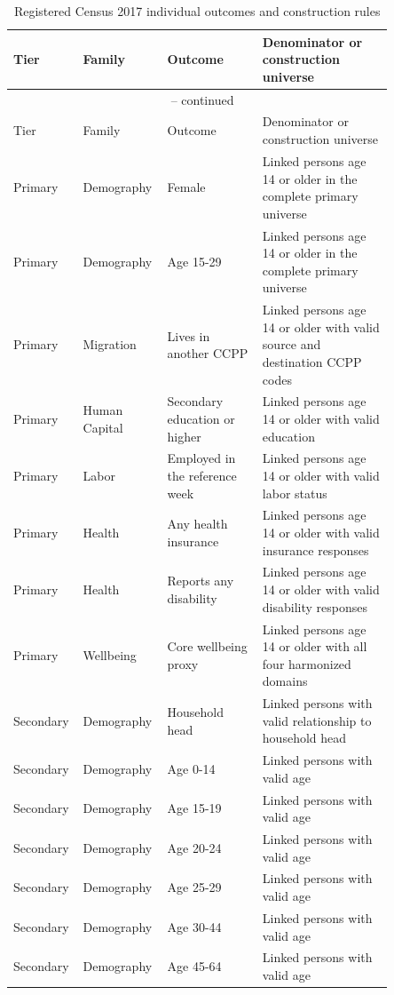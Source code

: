 \begingroup
\small
\begin{longtable}{p{0.10\linewidth}p{0.18\linewidth}p{0.24\linewidth}p{0.33\linewidth}}
\caption{Registered Census 2017 individual outcomes and construction rules}
\label{tab:rd_outcome_registry_2017_individual} \\
\toprule
Tier & Family & Outcome & Denominator or construction universe \\
\midrule
\endfirsthead
\multicolumn{4}{c}{\tablename\ \thetable{} -- continued} \\
\toprule
Tier & Family & Outcome & Denominator or construction universe \\
\midrule
\endhead
Primary & Demography & Female & Linked persons age 14 or older in the complete primary universe \\
Primary & Demography & Age 15-29 & Linked persons age 14 or older in the complete primary universe \\
Primary & Migration & Lives in another CCPP & Linked persons age 14 or older with valid source and destination CCPP codes \\
Primary & Human Capital & Secondary education or higher & Linked persons age 14 or older with valid education \\
Primary & Labor & Employed in the reference week & Linked persons age 14 or older with valid labor status \\
Primary & Health & Any health insurance & Linked persons age 14 or older with valid insurance responses \\
Primary & Health & Reports any disability & Linked persons age 14 or older with valid disability responses \\
Primary & Wellbeing & Core wellbeing proxy & Linked persons age 14 or older with all four harmonized domains \\
Secondary & Demography & Household head & Linked persons with valid relationship to household head \\
Secondary & Demography & Age 0-14 & Linked persons with valid age \\
Secondary & Demography & Age 15-19 & Linked persons with valid age \\
Secondary & Demography & Age 20-24 & Linked persons with valid age \\
Secondary & Demography & Age 25-29 & Linked persons with valid age \\
Secondary & Demography & Age 30-44 & Linked persons with valid age \\
Secondary & Demography & Age 45-64 & Linked persons with valid age \\

\end{longtable}
